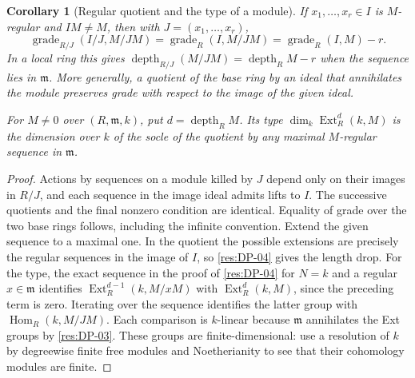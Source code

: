 \documentclass[11pt,oneside,openany]{book}
\newtheorem{corollary}[theorem]{Corollary}
\theoremstyle{definition}
\theoremstyle{remark}
\begin{document}
\begin{corollary}[Regular quotient and the type of a module]\label{res:DP-05}
If $x_1,\ldots,x_r\in I$ is $M$-regular and $IM\ne M$, then with
$J=(x_1,\ldots,x_r)$,
\[
 \operatorname{grade}_{R/J}(I/J,M/JM)
 =\operatorname{grade}_R(I,M/JM)
 =\operatorname{grade}_R(I,M)-r .
\]
In a local ring this gives
$\operatorname{depth}_{R/J}(M/JM)=\operatorname{depth}_R M-r$
when the sequence lies in $\mathfrak m$. More generally, a quotient
of the base ring by an ideal that annihilates the module preserves
grade with respect to the image of the given ideal.

For $M\ne0$ over $(R,\mathfrak m,k)$, put
$d=\operatorname{depth}_R M$. Its \emph{type}
$\dim_k\operatorname{Ext}_R^d(k,M)$ is the dimension over $k$ of the
socle of the quotient by any maximal $M$-regular sequence in
$\mathfrak m$.
\end{corollary}
\begin{proof}
Actions by sequences on a module killed by $J$ depend only on their
images in $R/J$, and each sequence in the image ideal admits lifts to
$I$. The successive quotients and the final nonzero condition are
identical. Equality of grade over the two base rings follows, including
the infinite convention. Extend the given sequence to a maximal one.
In the quotient the possible extensions are precisely the regular
sequences in the image of $I$, so \ref{res:DP-04} gives the length drop.
For the type, the exact sequence in the proof of \ref{res:DP-04} for
$N=k$ and a regular $x\in\mathfrak m$ identifies
$\operatorname{Ext}_R^{d-1}(k,M/xM)$ with
$\operatorname{Ext}_R^d(k,M)$, since the preceding term is zero.
Iterating over the sequence identifies the latter group with
$\operatorname{Hom}_R(k,M/JM)$. Each comparison is $k$-linear
because $\mathfrak m$ annihilates the Ext groups by \ref{res:DP-03}.
These groups are finite-dimensional: use a resolution of $k$ by
degreewise finite free modules and Noetherianity to see that their
cohomology modules are finite.
\end{proof}
\end{document}
